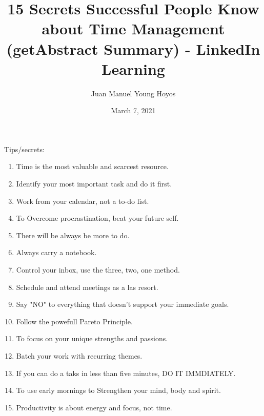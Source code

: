 \documentclass[12pt, letterpaper, twoside]{article}
\title{15 Secrets Successful People Know about Time Management (getAbstract Summary) - LinkedIn Learning}
\author{Juan Manuel Young Hoyos}
\date{March 7, 2021}
\begin{document}
\maketitle

Tips/secrets:

\begin{enumerate}
	\item Time is the most valuable and scarcest resource.
	\item Identify your most important task and do it first.
	\item Work from your calendar, not a to-do list.
	\item To Overcome procrastination, beat your future self.
	\item There will be always be more to do.
	\item Always carry a notebook.
	\item Control your inbox, use the three, two, one method.
	\item Schedule and attend meetings as a las resort.
	\item Say "NO" to everything that doesn't support your immediate goals.
	\item Follow the powefull Pareto Principle.
	\item To focus on your unique strengths and passions.
	\item Batch your work with recurring themes.
	\item If you can do a taks in less than five minutes, DO IT IMMDIATELY.
	\item To use early mornings to Strengthen your mind, body and spirit.
	\item Productivity is about energy and focus, not time.
\end{enumerate}
\end{document}
